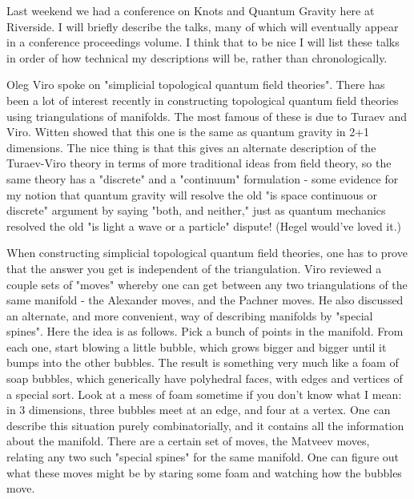 

Last weekend we had a conference on Knots and Quantum Gravity here at
Riverside.  I will briefly describe the talks, many of which
will eventually appear in a conference proceedings volume.  I think that
to be nice I will list these talks in order of how technical my
descriptions will be, rather than chronologically.

Oleg Viro spoke on "simplicial topological quantum field theories".
There has been a lot of interest recently in constructing topological
quantum field theories using triangulations of manifolds.  The most
famous of these is due to Turaev and Viro.  Witten showed that this one
is the same as quantum gravity in 2+1 dimensions.  The nice thing is
that this gives an alternate description of the Turaev-Viro theory in
terms of more traditional ideas from field theory, so the same theory
has a "discrete" and a "continuum" formulation - some evidence for my
notion that quantum gravity will resolve the old "is space continuous or
discrete" argument by saying "both, and neither," just as quantum
mechanics resolved the old "is light a wave or a particle" dispute!
(Hegel would've loved it.) 

When constructing simplicial topological quantum field theories, one has
to prove that the answer you get is independent of the triangulation.
Viro reviewed a couple sets of "moves" whereby one can get between any
two triangulations of the same manifold - the Alexander moves, and the
Pachner moves.  He also discussed an alternate, and more convenient, way
of describing manifolds by "special spines".  Here the idea is as
follows.  Pick a bunch of points in the manifold.  From each one, start
blowing a little bubble, which grows bigger and bigger until it bumps
into the other bubbles.  The result is something very much like a foam
of soap bubbles, which generically have polyhedral faces, with edges and
vertices of a special sort.  Look at a mess of foam sometime if you
don't know what I mean: in 3 dimensions, three bubbles meet at an edge,
and four at a vertex.  One can describe this situation purely
combinatorially, and it contains all the information about the manifold.
There are a certain set of moves, the Matveev moves, relating any two
such "special spines" for the same manifold.  One can figure out what
these moves might be by staring some foam and watching how the bubbles
move. 


